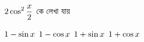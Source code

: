 \documentclass{exam}
\begin{document}
\begin{questions}
\question  $\mathlarger{2\cos ^{2} \frac{x}{2}}$  কে লেখা যায়

\begin{oneparchoices}
 \choice $\mathlarger{1-\sin x}$
 \choice $\mathlarger{1-\cos x}$
 \choice $\mathlarger{1+\sin x}$
\choice $\mathlarger{1+ \cos x}$
\end{oneparchoices}

\end{questions}
\end{document}
